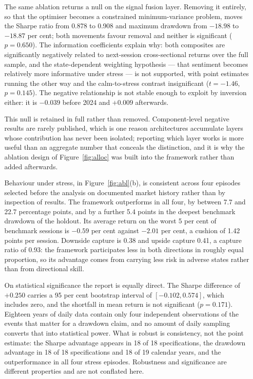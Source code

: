 The same ablation returns a null on the signal fusion layer. Removing it entirely, so that
the optimiser becomes a constrained minimum-variance problem, moves the Sharpe ratio from
0.878 to 0.908 and maximum drawdown from $-18.98$ to $-18.87$ per cent; both movements
favour removal and neither is significant ($p = 0.650$). The information coefficients
explain why: both composites are significantly negatively related to next-session
cross-sectional returns over the full sample, and the state-dependent weighting hypothesis
--- that sentiment becomes relatively more informative under stress --- is not supported,
with point estimates running the other way and the calm-to-stress contrast insignificant
($t = -1.46$, $p = 0.145$). The negative relationship is not stable enough to exploit by
inversion either: it is $-0.039$ before 2024 and $+0.009$ afterwards.

This null is retained in full rather than removed. Component-level negative results are
rarely published, which is one reason architectures accumulate layers whose contribution
has never been isolated; reporting which layer works is more useful than an aggregate
number that conceals the distinction, and it is why the ablation design of
Figure~\ref{fig:alloc} was built into the framework rather than added afterwards.

Behaviour under stress, in Figure~\ref{fig:abl}(b), is consistent across four episodes
selected before the analysis on documented market history rather than by inspection of
results. The framework outperforms in all four, by between 7.7 and 22.7 percentage points,
and by a further 5.4 points in the deepest benchmark drawdown of the holdout. Its average
return on the worst 5 per cent of benchmark sessions is $-0.59$ per cent against $-2.01$
per cent, a cushion of 1.42 points per session. Downside capture is 0.38 and upside
capture 0.41, a capture ratio of 0.93: the framework participates less in both directions
in roughly equal proportion, so its advantage comes from carrying less risk in adverse
states rather than from directional skill.

On statistical significance the report is equally direct. The Sharpe difference of
$+0.250$ carries a 95 per cent bootstrap interval of $[-0.102, 0.574]$, which includes
zero, and the shortfall in mean return is not significant ($p = 0.171$). Eighteen years of
daily data contain only four independent observations of the events that matter for a
drawdown claim, and no amount of daily sampling converts that into statistical power. What
is robust is consistency, not the point estimate: the Sharpe advantage appears in 18 of 18
specifications, the drawdown advantage in 18 of 18 specifications and 18 of 19 calendar
years, and the outperformance in all four stress episodes. Robustness and significance are
different properties and are not conflated here.

